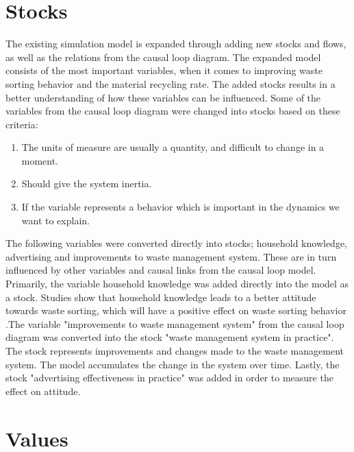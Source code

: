 \section{Stocks}

\indent \newline
The existing simulation model is expanded through adding new stocks and flows, as well as the relations from the causal loop diagram. The expanded model consists of the most important variables, when it comes to improving waste sorting behavior and the material recycling rate. The added stocks results in a better understanding of how these variables can be influenced. Some of the variables from the causal loop diagram were changed into stocks based on these criteria:

\indent \newline
\begin{enumerate}
\item The units of measure are usually a quantity, and difficult to change in a moment.
\item Should give the system inertia.
\item	If the variable represents a behavior which is important in the dynamics we want to explain. 
\cite[p. 192]{system}
\end{enumerate}


\indent \newline
The following variables were converted directly into stocks; household knowledge, advertising and improvements to waste management system. These are in turn influenced by other variables and causal links from the causal loop model. Primarily, the variable household knowledge was added directly into the model as a stock. Studies show that household knowledge leads to a better attitude towards waste sorting, which will have a positive effect on waste sorting behavior \cite[p. 13, Preliminary report]{intention}.The variable "improvements to waste management system" from the causal loop diagram was converted into the stock "waste management system in practice". The stock represents improvements and changes made to the waste management system. The model accumulates the change in the system over time. Lastly, the stock "advertising effectiveness in practice" was added in order to measure the effect on attitude. 

\section{Values}


